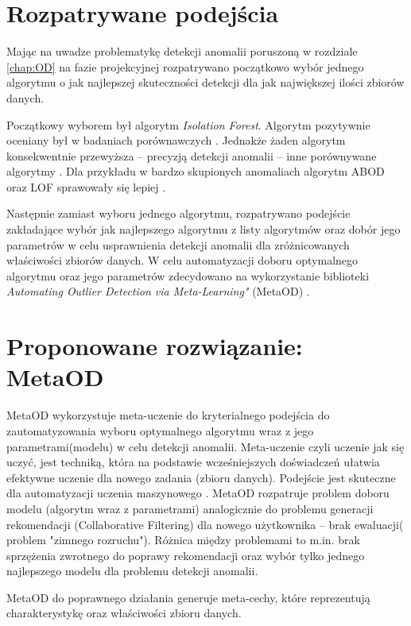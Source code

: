 \section{Rozpatrywane podejścia}
Mając na uwadze problematykę detekcji anomalii poruszoną w rozdziale \ref{chap:OD} na fazie projekcyjnej rozpatrywano początkowo wybór jednego algorytmu o jak najlepszej skuteczności detekcji dla jak największej ilości zbiorów danych. 

Początkowy wyborem był algorytm \textit{Isolation Forest}\cite{iforest}. Algorytm pozytywnie oceniany był w badaniach porównawczych \cite{emmott2015meta,aggarwal2017ens}. Jednakże żaden algorytm konsekwentnie przewyższa -- precyzją detekcji anomalii -- inne porównywane algorytmy \cite{aggarwal2017ens}. Dla przykładu w bardzo skupionych anomaliach algorytm ABOD \cite{abod} oraz LOF \cite{lof} sprawowały się lepiej \cite{emmott2015meta}. 

Następnie zamiast wyboru jednego algorytmu, rozpatrywano podejście zakładające wybór jak najlepszego algorytmu z listy algorytmów oraz dobór jego parametrów w celu usprawnienia detekcji anomalii dla zróżnicowanych właściwości zbiorów danych. 
W celu automatyzacji doboru optymalnego algorytmu oraz jego parametrów zdecydowano na wykorzystanie biblioteki \textit{Automating Outlier Detection via Meta-Learning"} (MetaOD) \cite{zhao2020metaod}. 

\section{Proponowane rozwiązanie: MetaOD}
MetaOD wykorzystuje meta-uczenie do kryterialnego podejścia do zautomatyzowania wyboru optymalnego algorytmu wraz z jego parametrami(modelu) w celu detekcji anomalii. Meta-uczenie czyli uczenie jak się uczyć, jest techniką, która na podstawie wcześniejszych doświadczeń ułatwia efektywne uczenie dla nowego zadania (zbioru danych). Podejście jest skuteczne dla automatyzacji uczenia maszynowego \cite{vanschoren2018meta}. MetaOD rozpatruje problem doboru modelu (algorytm wraz z parametrami) analogicznie do problemu generacji rekomendacji (Collaborative Filtering) dla nowego użytkownika -- brak ewaluacji( problem "zimnego rozruchu"). Różnica między problemami to m.in. brak sprzężenia zwrotnego do poprawy rekomendacji oraz wybór tylko jednego najlepszego modelu dla problemu detekcji anomalii.

MetaOD do poprawnego działania generuje meta-cechy, które reprezentują charakterystykę oraz właściwości zbioru danych. 

